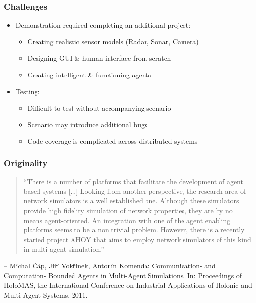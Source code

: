 \documentclass[mathserif,usenames,dvipsnames]{beamer}
\begin{document}
\frame
{
    \frametitle{Challenges}
    \begin{itemize}
        \item Demonstration required completing an additional project:
        \begin{itemize}
            \item Creating realistic sensor models (Radar, Sonar, Camera)
            \item Designing GUI \& human interface from scratch
            \item Creating intelligent \& functioning agents
        \end{itemize}
        \item Testing:
        \begin{itemize}
            \item Difficult to test without accompanying scenario
            \item Scenario may introduce additional bugs
            \item Code coverage is complicated across distributed systems
        \end{itemize}
    \end{itemize}
}

\frame
{
    \frametitle{Originality}
    \begin{quote}
        \small 
        ``There is a number of platforms that facilitate the development of agent based systems [...] Looking from another perspective, the research area of network simulators is a well established one. Although these simulators provide high fidelity simulation of network properties, they are by no means agent-oriented. An integration with one of the agent enabling platforms seems to be a non trivial problem. However, there is a recently started project AHOY that aims to employ network simulators of this kind in multi-agent simulation.''
    \end{quote}
    \vspace{0.5cm}
    \tiny
    -- Michal \v{C}\'{a}p, Ji\v{r}\'{i} Vok\v{r}\'{i}nek, Anton\'{i}n Komenda: Communication- and Computation- Bounded Agents in Multi-Agent Simulations. In: Proceedings of HoloMAS, the International Conference on Industrial Applications of Holonic and Multi-Agent Systems, 2011.

}
\end{document}

